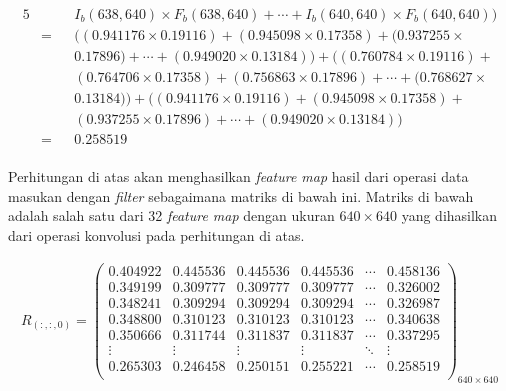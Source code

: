 \begin{alignat*}{5}
                            &   &&I_{b}(638, 640)\times F_{b}(638, 640) + \cdots + I_{b}(640, 640)\times F_{b}(640, 640) \bigr) \\
                            &=  &&\bigl( (0.941176\times 0.19116) + (0.945098\times 0.17358) + (0.937255\times \\
                            &   &&0.17896) + \cdots + (0.949020\times 0.13184) \bigr) + \bigl( (0.760784\times 0.19116) + \\
                            &   &&(0.764706\times 0.17358) + (0.756863\times 0.17896) + \cdots + (0.768627\times \\
                            &   &&0.13184) \bigr) + \bigl( (0.941176\times 0.19116) + (0.945098\times 0.17358) + \\
                            &   &&(0.937255\times 0.17896) + \cdots + (0.949020\times 0.13184) \bigr) \\
                            &=  &&0.258519 \\
    \end{alignat*}

    Perhitungan di atas akan menghasilkan \textit{feature map} hasil dari operasi data masukan dengan \textit{filter} sebagaimana matriks di bawah ini. Matriks di bawah adalah salah satu dari 32 \textit{feature map} dengan ukuran $640\times 640$ yang dihasilkan dari operasi konvolusi pada perhitungan di atas.

    \begin{align*}
        R_{(:, :, 0)} = 
        \begin{pmatrix}
            0.404922 & 0.445536 & 0.445536 & 0.445536 & \cdots & 0.458136 \\
            0.349199 & 0.309777 & 0.309777 & 0.309777 & \cdots & 0.326002 \\
            0.348241 & 0.309294 & 0.309294 & 0.309294 & \cdots & 0.326987 \\
            0.348800 & 0.310123 & 0.310123 & 0.310123 & \cdots & 0.340638 \\
            0.350666 & 0.311744 & 0.311837 & 0.311837 & \cdots & 0.337295 \\
            \vdots   & \vdots   & \vdots   & \vdots   & \ddots &\vdots \\
            0.265303 & 0.246458 & 0.250151 & 0.255221 & \cdots & 0.258519 \\
        \end{pmatrix}_{640\times 640}
    \end{align*}

